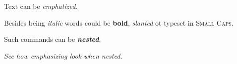 \documentclass{article}
\begin{document}
	Text can be \emph{emphatized}.
	
	Besides being \textit{italic} words could be \textbf{bold}, \textsl{slanted}
	ot typeset in \textsc{Small Caps}.
	
	Such commands can be \textit{\textbf{nested}}.
	
	\emph{See how \emph{emphasizing} look when nested.}
\end{document}
